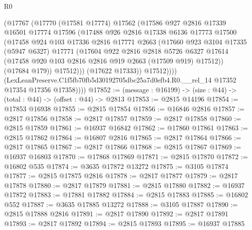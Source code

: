 \begin{lexlean}{R0}
\begin{coremodule}
                (@17767
                  (@17770
                    (@17581 @17774)
                    @17562
                    (@17586
                      @927
                      @2816
                      @17339
                      @16501
                      @17774
                      @17596
                      (@17488
                        @926
                        @2816
                        @17338
                        @6136
                        @17773
                        @17500
                        (@17458
                          @924
                          @103
                          @17336
                          @2816
                          @17771
                          @2663
                          (@17660
                            @923
                            @3104
                            @17335
                            (@5947 @6327)
                            @17771
                            (@17604
                              @922
                              @2816
                              @2818
                              @5726
                              @6327
                              @17614
                              (@17458 @920 @103 @2816 @2816 @919 @2663 (@17509 @919) @17512))
                            (@17684 @179))
                          @17512)))
                    (@17622 @17333))
                  @17512))))
          (LexLeanPreserve.C1f5fb70fb5d30192705dbc25a7d0efb4.R0.__rel_14
            @17352
            @17354
            @17356
            @17358))))
@17852 := (message : @16199) -> (size : @44) -> (total : @44) -> (offset : @44) -> @2813
@17853 := @2815 @14196
@17854 := @17853 @16938
@17855 := @2815 @17854
@17856 := @16846 @2816
@17857 := @2817 @17856
@17858 := @2817 @17857
@17859 := @2817 @17858
@17860 := @2815 @17859
@17861 := @16937 @16842
@17862 := @17860 @17861
@17863 := @2815 @17862
@17864 := @16807 @2816
@17865 := @2817 @17864
@17866 := @2817 @17865
@17867 := @2817 @17866
@17868 := @2815 @17867
@17869 := @16937 @16803
@17870 := @17868 @17869
@17871 := @2815 @17870
@17872 := @16802 @535
@17874 := @3635 @17872 @13272
@17875 := @3105 @17874
@17877 := @2815 @17875 @2816
@17878 := @2817 @17877
@17879 := @2817 @17878
@17880 := @2817 @17879
@17881 := @2815 @17880
@17882 := @16937 @17872
@17883 := @17881 @17882
@17884 := @2815 @17883
@17885 := @16802 @552
@17887 := @3635 @17885 @13272
@17888 := @3105 @17887
@17890 := @2815 @17888 @2816
@17891 := @2817 @17890
@17892 := @2817 @17891
@17893 := @2817 @17892
@17894 := @2815 @17893
@17895 := @16937 @17885

\end{coremodule}
\end{lexlean}
